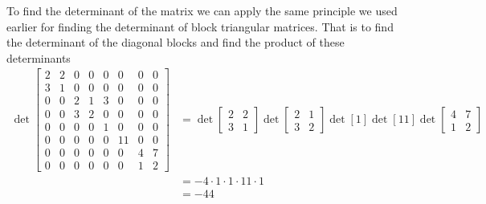 \documentclass{report}
\begin{document}
To find the determinant of the matrix we can apply the same principle we used earlier for finding the determinant of block triangular matrices.  That is to find the determinant of the diagonal blocks and find the product of these determinants
$$
\begin{aligned}
\det\begin{bmatrix} 
2&2&0&0&0&0&0&0\\
3&1&0&0&0&0&0&0\\
0&0&2&1&3&0&0&0\\
0&0&3&2&0&0&0&0\\
0&0&0&0&1&0&0&0\\
0&0&0&0&0&11&0&0\\
0&0&0&0&0&0&4&7\\
0&0&0&0&0&0&1&2
\end{bmatrix} &= \det\begin{bmatrix} 2 & 2 \\ 3 & 1 \end{bmatrix}\det\begin{bmatrix}2&1 \\3&2\end{bmatrix}\det[1]\det[11]\det\begin{bmatrix}4&7\\1&2\end{bmatrix} \\
& = -4 \cdot 1 \cdot 1 \cdot 11 \cdot 1 \\
& = -44
\end{aligned}
$$
\end{document}
